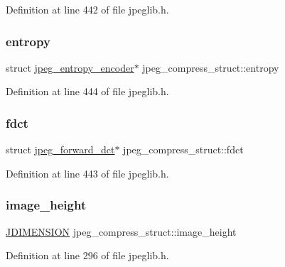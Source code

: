 Definition at line 442 of file jpeglib.\+h.

\mbox{\label{structjpeg__compress__struct_a30477f9e5f6be16823e1aff2762ae270}} 
\subsubsection{\texorpdfstring{entropy}{entropy}}
{\footnotesize\ttfamily struct \mbox{\hyperlink{structjpeg__entropy__encoder}{jpeg\+\_\+entropy\+\_\+encoder}}$\ast$ jpeg\+\_\+compress\+\_\+struct\+::entropy}



Definition at line 444 of file jpeglib.\+h.

\mbox{\label{structjpeg__compress__struct_ac113c777486860f0b2f3784345073a83}} 
\subsubsection{\texorpdfstring{fdct}{fdct}}
{\footnotesize\ttfamily struct \mbox{\hyperlink{structjpeg__forward__dct}{jpeg\+\_\+forward\+\_\+dct}}$\ast$ jpeg\+\_\+compress\+\_\+struct\+::fdct}



Definition at line 443 of file jpeglib.\+h.

\mbox{\label{structjpeg__compress__struct_a30863835e7785b7df800811f842b2da0}} 
\subsubsection{\texorpdfstring{image\_height}{image\_height}}
{\footnotesize\ttfamily \mbox{\hyperlink{jmorecfg_8h_a04ed4674f6f1d0d50ec241531e38274f}{J\+D\+I\+M\+E\+N\+S\+I\+ON}} jpeg\+\_\+compress\+\_\+struct\+::image\+\_\+height}



Definition at line 296 of file jpeglib.\+h.

